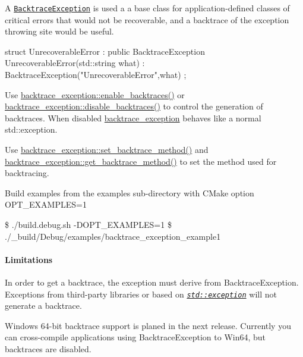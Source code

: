 A \href{https://markjolah.github.io/BacktraceException/classbacktrace__exception_1_1BacktraceException.html}{\tt {\ttfamily Backtrace\+Exception}} is used a a base class for application-\/defined classes of critical errors that would not be recoverable, and a backtrace of the exception throwing site would be useful. \begin{DoxyVerb}struct UnrecoverableError : public BacktraceException {
    UnrecoverableError(std::string what) : BacktraceException("UnrecoverableError",what) {}
};
\end{DoxyVerb}



\begin{DoxyItemize}
\item Use {\ttfamily \hyperlink{namespacebacktrace__exception_a4e1b86dea1b116c7bac88d89448a808e}{backtrace\+\_\+exception\+::enable\+\_\+backtraces()}} or {\ttfamily \hyperlink{namespacebacktrace__exception_a134895cbad5bc441a941f1f49b43a78a}{backtrace\+\_\+exception\+::disable\+\_\+backtraces()}} to control the generation of backtraces. When disabled \hyperlink{namespacebacktrace__exception}{backtrace\+\_\+exception} behaves like a normal {\ttfamily std\+::exception}.
\item Use {\ttfamily \hyperlink{namespacebacktrace__exception_afe7dd97c0deefd1a0e9cb08f9c8089b2}{backtrace\+\_\+exception\+::set\+\_\+backtrace\+\_\+method()}} and {\ttfamily \hyperlink{namespacebacktrace__exception_a024cd6e7707e7f7cbb9283e60907142c}{backtrace\+\_\+exception\+::get\+\_\+backtrace\+\_\+method()}} to set the method used for backtracing.
\item Build examples from the examples sub-\/directory with C\+Make option {\ttfamily O\+P\+T\+\_\+\+E\+X\+A\+M\+P\+L\+ES=1}

\$ ./build.debug.\+sh -\/\+D\+O\+P\+T\+\_\+\+E\+X\+A\+M\+P\+L\+ES=1 \$ ./\+\_\+build/\+Debug/examples/backtrace\+\_\+exception\+\_\+example1
\end{DoxyItemize}

\paragraph*{Limitations}


\begin{DoxyItemize}
\item In order to get a backtrace, the exception must derive from {\ttfamily Backtrace\+Exception}. Exceptions from third-\/party libraries or based on \href{https://en.cppreference.com/w/cpp/error/exception}{\tt {\itshape std\+::exception}} will not generate a backtrace.
\item Windows 64-\/bit backtrace support is planed in the next release. Currently you can cross-\/compile applications using {\ttfamily Backtrace\+Exception} to Win64, but backtraces are disabled.
\end{DoxyItemize}


